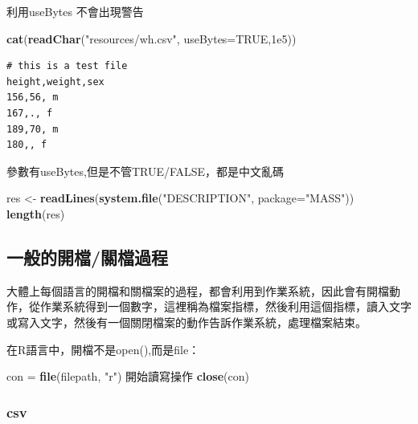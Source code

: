 \documentclass[]{book}
\newenvironment{Shaded}{\begin{snugshade}}{\end{snugshade}}
\newcommand{\DataTypeTok}[1]{\textcolor[rgb]{0.13,0.29,0.53}{#1}}
\newcommand{\FloatTok}[1]{\textcolor[rgb]{0.00,0.00,0.81}{#1}}
\newcommand{\KeywordTok}[1]{\textcolor[rgb]{0.13,0.29,0.53}{\textbf{#1}}}
\newcommand{\NormalTok}[1]{#1}
\newcommand{\OtherTok}[1]{\textcolor[rgb]{0.56,0.35,0.01}{#1}}
\newcommand{\StringTok}[1]{\textcolor[rgb]{0.31,0.60,0.02}{#1}}
\theoremstyle{definition}
\theoremstyle{definition}
\theoremstyle{definition}
\theoremstyle{remark}
\begin{document}
利用useBytes 不會出現警告

\begin{Shaded}
\begin{Highlighting}[]
\KeywordTok{cat}\NormalTok{(}\KeywordTok{readChar}\NormalTok{(}\StringTok{"resources/wh.csv"}\NormalTok{, }\DataTypeTok{useBytes=}\OtherTok{TRUE}\NormalTok{,}\FloatTok{1e5}\NormalTok{))  }
\end{Highlighting}
\end{Shaded}

\begin{verbatim}
# this is a test file
height,weight,sex
156,56, m
167,., f
189,70, m
180,, f
\end{verbatim}

參數有useBytes,但是不管TRUE/FALSE，都是中文亂碼

\begin{Shaded}
\begin{Highlighting}[]
\NormalTok{res <-}\StringTok{ }\KeywordTok{readLines}\NormalTok{(}\KeywordTok{system.file}\NormalTok{(}\StringTok{"DESCRIPTION"}\NormalTok{, }\DataTypeTok{package=}\StringTok{"MASS"}\NormalTok{))}
\KeywordTok{length}\NormalTok{(res)}
\end{Highlighting}
\end{Shaded}

\subsection{一般的開檔/關檔過程}

大體上每個語言的開檔和關檔案的過程，都會利用到作業系統，因此會有開檔動作，從作業系統得到一個數字，這裡稱為檔案指標，然後利用這個指標，讀入文字或寫入文字，然後有一個關閉檔案的動作告訴作業系統，處理檔案結束。

在R語言中，開檔不是open(),而是file：

\begin{Shaded}
\begin{Highlighting}[]
\NormalTok{  con =}\StringTok{ }\KeywordTok{file}\NormalTok{(filepath, }\StringTok{"r"}\NormalTok{)}
\NormalTok{  開始讀寫操作}
  \KeywordTok{close}\NormalTok{(con)}
\end{Highlighting}
\end{Shaded}

\hypertarget{csv}{%
\subsubsection{csv}\label{csv}}
\end{document}
